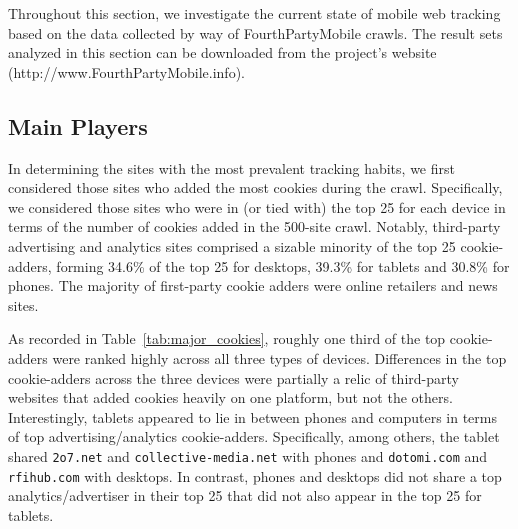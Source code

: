 \documentclass{acm_proc_article-sp}
\begin{document}
Throughout this section, we investigate the current state of mobile web tracking based on the data collected by way of FourthPartyMobile crawls. The result sets analyzed in this section can be downloaded from the project's website (http://www.FourthPartyMobile.info).

\subsection{Main Players}

In determining the sites with the most prevalent tracking habits, we first considered those sites who added the most cookies during the crawl. Specifically, we considered those sites who were in (or tied with) the top 25 for each device in terms of the number of cookies added in the 500-site crawl. Notably, third-party advertising and analytics sites comprised a sizable minority of the top 25 cookie-adders, forming 34.6\% of the top 25 for desktops, 39.3\% for tablets and 30.8\% for phones. The majority of first-party cookie adders were online retailers and news sites.

As recorded in Table~\ref{tab:major_cookies}, roughly one third of the top cookie-adders were ranked highly across all three types of devices. Differences in the top cookie-adders across the three devices were partially a relic of third-party websites that added cookies heavily on one platform, but not the others. Interestingly, tablets appeared to lie in between phones and computers in terms of top advertising/analytics cookie-adders. Specifically, among others, the tablet shared \texttt{2o7.net} and \texttt{collective-media.net} with phones and \texttt{dotomi.com} and \texttt{rfihub.com} with desktops. In contrast, phones and desktops did not share a top analytics/advertiser in their top 25 that did not also appear in the top 25 for tablets.
\end{document}
